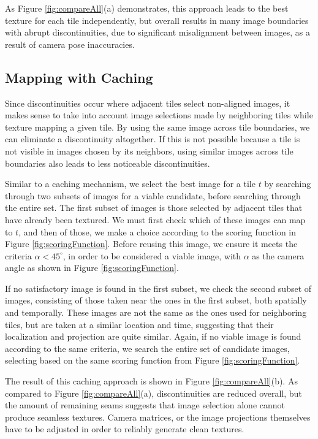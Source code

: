 \message{ !name(oldpaper.tex)}\documentclass[10pt,twocolumn,letterpaper]{article}
\begin{document}
As Figure \ref{fig:compareAll}(a) demonstrates, this approach leads to
the best texture for each tile independently, but overall results in
many image boundaries with abrupt discontinuities, due to significant
misalignment between images, as a result of camera pose inaccuracies.

\subsection{Mapping with Caching}
\label{sec:mappingWithCaching}
Since discontinuities occur where adjacent tiles select non-aligned
images, it makes sense to take into account image selections made by
neighboring tiles while texture mapping a given tile. By using the
same image across tile boundaries, we can eliminate a discontinuity
altogether. If this is not possible because a tile is not visible in
images chosen by its neighbors, using similar images across tile
boundaries also leads to less noticeable discontinuities.

Similar to a caching mechanism, we select the best image for a tile
$t$ by searching through two subsets of images for a viable candidate,
before searching through the entire set. The first subset of images is
those selected by adjacent tiles that have already been textured. We
must first check which of these images can map to $t$, and then of
those, we make a choice according to the scoring function in Figure
\ref{fig:scoringFunction}. Before reusing this image, we ensure it
meets the criteria $\alpha < 45^\circ$, in order to be considered a
viable image, with $\alpha$ as the camera angle as shown in Figure
\ref{fig:scoringFunction}.

If no satisfactory image is found in the first subset, we check the
second subset of images, consisting of those taken near the ones in
the first subset, both spatially and temporally. These images are not
the same as the ones used for neighboring tiles, but are taken at a
similar location and time, suggesting that their localization and
projection are quite similar. Again, if no viable image is found
according to the same criteria, we search the entire set of candidate
images, selecting based on the same scoring function from Figure
\ref{fig:scoringFunction}.

The result of this caching approach is shown in Figure
\ref{fig:compareAll}(b). As compared to Figure
\ref{fig:compareAll}(a), discontinuities are reduced overall, but the
amount of remaining seams suggests that image selection alone cannot
produce seamless textures. Camera matrices, or the image projections
themselves have to be adjusted in order to reliably generate clean
textures.
\end{document}
